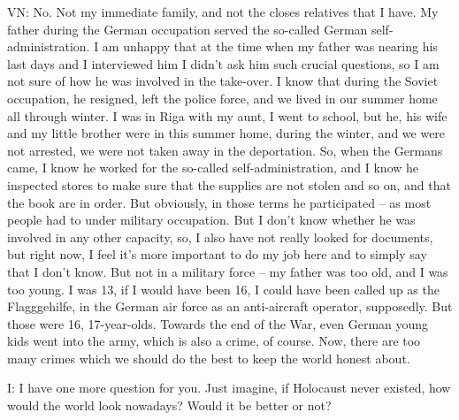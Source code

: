 VN: No. Not my immediate family, and not the closes relatives that I have. My father during the German occupation served the so-called German self-administration. I am unhappy that at the time when my father was nearing his last days and I interviewed him I didn’t ask him such crucial questions, so I am not sure of how he was involved in the take-over. I know that during the Soviet occupation, he resigned, left the police force, and we lived in our summer home all through winter. I was in Riga with my aunt, I went to school, but he, his wife and my little brother were in this summer home, during the winter, and we were not arrested, we were not taken away in the deportation. So, when the Germans came, I know he worked for the so-called self-administration, and I know he inspected stores to make sure that the supplies are not stolen and so on, and that the book are in order. But obviously, in those terms he participated – as most people had to under military occupation. But I don’t know whether he was involved in any other capacity, so, I also have not really looked for documents, but right now, I feel it’s more important to do my job here and to simply say that I don’t know. But not in a military force – my father was too old, and I was too young. I was 13, if I would have been 16, I could have been called up as the Flagggehilfe, in the German air force as an anti-aircraft operator, supposedly. But those were 16, 17-year-olds. Towards the end of the War, even German young kids went into the army, which is also a crime, of course. Now, there are too many crimes which we should do the best to keep the world honest about. 

I: I have one more question for you. Just imagine, if Holocaust never existed, how would the world look nowadays? Would it be better or not?

